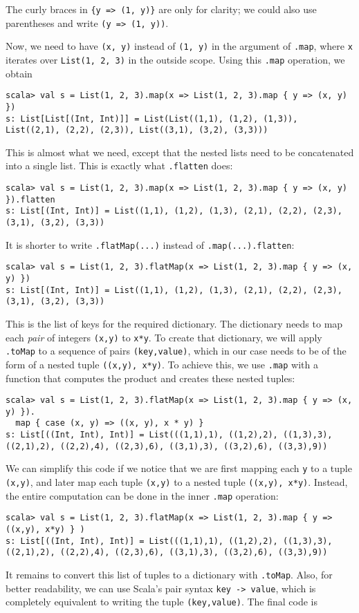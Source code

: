 \noindent The curly braces in \lstinline!{y => (1, y)}! are only
for clarity; we could also use parentheses and write \lstinline!(y => (1, y))!. 

Now, we need to have \lstinline!(x, y)! instead of \lstinline!(1, y)!
in the argument of \lstinline!.map!, where \lstinline!x! iterates
over \lstinline!List(1, 2, 3)! in the outside scope. Using this \lstinline!.map!
operation, we obtain
\begin{lstlisting}
scala> val s = List(1, 2, 3).map(x => List(1, 2, 3).map { y => (x, y) })
s: List[List[(Int, Int)]] = List(List((1,1), (1,2), (1,3)), List((2,1), (2,2), (2,3)), List((3,1), (3,2), (3,3)))
\end{lstlisting}
This is almost what we need, except that the nested lists need to
be concatenated into a single list. This is exactly what \lstinline!.flatten!
does:
\begin{lstlisting}
scala> val s = List(1, 2, 3).map(x => List(1, 2, 3).map { y => (x, y) }).flatten
s: List[(Int, Int)] = List((1,1), (1,2), (1,3), (2,1), (2,2), (2,3), (3,1), (3,2), (3,3))
\end{lstlisting}
It is shorter to write \lstinline!.flatMap(...)! instead of \lstinline!.map(...).flatten!:
\begin{lstlisting}
scala> val s = List(1, 2, 3).flatMap(x => List(1, 2, 3).map { y => (x, y) })
s: List[(Int, Int)] = List((1,1), (1,2), (1,3), (2,1), (2,2), (2,3), (3,1), (3,2), (3,3)) 
\end{lstlisting}
This is the list of keys for the required dictionary. The dictionary
needs to map each \emph{pair} of integers \lstinline!(x,y)! to \lstinline!x*y!.
To create that dictionary, we will apply \lstinline!.toMap! to a
sequence of pairs \lstinline!(key,value)!, which in our case needs
to be of the form of a nested tuple \lstinline!((x,y), x*y)!. To
achieve this, we use \lstinline!.map! with a function that computes
the product and creates these nested tuples:
\begin{lstlisting}
scala> val s = List(1, 2, 3).flatMap(x => List(1, 2, 3).map { y => (x, y) }).
  map { case (x, y) => ((x, y), x * y) }
s: List[((Int, Int), Int)] = List(((1,1),1), ((1,2),2), ((1,3),3), ((2,1),2), ((2,2),4), ((2,3),6), ((3,1),3), ((3,2),6), ((3,3),9))
\end{lstlisting}
We can simplify this code if we notice that we are first mapping each
\lstinline!y! to a tuple \lstinline!(x,y)!, and later map each tuple
\lstinline!(x,y)! to a nested tuple \lstinline!((x,y), x*y)!. Instead,
the entire computation can be done in the inner \lstinline!.map!
operation:
\begin{lstlisting}
scala> val s = List(1, 2, 3).flatMap(x => List(1, 2, 3).map { y => ((x,y), x*y) } )
s: List[((Int, Int), Int)] = List(((1,1),1), ((1,2),2), ((1,3),3), ((2,1),2), ((2,2),4), ((2,3),6), ((3,1),3), ((3,2),6), ((3,3),9))
\end{lstlisting}
It remains to convert this list of tuples to a dictionary with \lstinline!.toMap!.
Also, for better readability, we can use Scala's pair syntax \lstinline!key -> value!,
which is completely equivalent to writing the tuple \lstinline!(key,value)!.
The final code is

